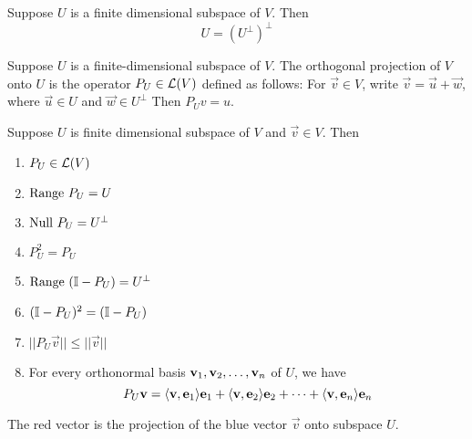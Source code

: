 \begin{theorem}
    Suppose $U$ is a finite dimensional subspace of $V$. Then 
    \[ U = \left( U^\perp \right)^\perp\]
\end{theorem}
\begin{definition}
Suppose $U$ is a finite-dimensional subspace of $V$. The orthogonal projection of $V$ onto $U$ is the operator $P_U \in \mathcal L(V)$ defined as follows: 
For $\vec v \in V$, write $\vec v = \vec u + \vec w$, where $\vec u \in U$ and $\vec w \in U^\perp$ Then $P_Uv = u$.
\end{definition}
\begin{theorem}
    Suppose $U$ is finite dimensional subspace of $V$ and $\vec v \in V$. Then 
    \begin{enumerate}[label = (\alph*)]
        \item $P_U \in \mathcal L(V)$
        \item $\text{Range } P_U = U$
        \item $\text{Null } P_U = U^\perp$
        \item $P^2_U = P_U$
        \item $\text{Range } (\mathbb I - P_U) = U^\perp$
        \item $(\mathbb I - P_U)^2 = (\mathbb I - P_U)$
        \item $||P_U \vec v|| \leq ||\vec v||$
        \item For every orthonormal basis ${\mathbf v}_1,{\mathbf v}_2, \ldots, {\mathbf v}_{n}$ of $U$, we have \[P_U \mathbf v = \langle \mathbf v, \mathbf e_1 \rangle \mathbf e_1 + \langle \mathbf v, \mathbf e_2 \rangle \mathbf e_2 + \cdots + \langle \mathbf v, \mathbf e_n \rangle \mathbf e_n\]
    \end{enumerate}
    \begin{center}

    The red vector is the projection of the blue vector $\vec v$ onto subspace $U$.
\end{center}
\end{theorem}



